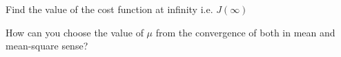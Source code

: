 \documentclass[journal,12pt,twocolumn]{IEEEtran}
\begin{document}
\begin{problem}
Find the value of the cost function at infinity i.e. $J(\infty)$
\end{problem}
\begin{problem}
How can you choose the value of $\mu$ from the convergence of both in mean and mean-square sense?
\end{problem}
\end{document}
